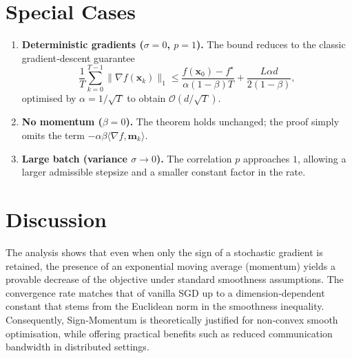 \documentclass{article}
\begin{document}
\section*{Special Cases}
\begin{enumerate}[label=\alph*.]
\item \textbf{Deterministic gradients ($\sigma=0$, $p=1$).}  
The bound reduces to the classic gradient‑descent guarantee
\[
\frac{1}{T}\sum_{k=0}^{T-1}\|\nabla f(\mathbf{x}_{k})\|_{1}
\le \frac{f(\mathbf{x}_{0})-f^{\star}}{\alpha(1-\beta)T}
+\frac{L\alpha d}{2(1-\beta)},
\]
optimised by $\alpha=1/\sqrt{T}$ to obtain $\mathcal{O}(d/\sqrt{T})$.
\item \textbf{No momentum ($\beta=0$).}  
The theorem holds unchanged; the proof simply omits the term $-\alpha\beta\langle\nabla f,\mathbf{m}_{k}\rangle$.
\item \textbf{Large batch (variance $\sigma\to0$).}  
The correlation $p$ approaches $1$, allowing a larger admissible stepsize and a smaller constant factor in the rate.
\end{enumerate}

\section*{Discussion}
The analysis shows that even when only the sign of a stochastic gradient is retained, the presence of an exponential moving average (momentum) yields a provable decrease of the objective under standard smoothness assumptions.  The convergence rate matches that of vanilla SGD up to a dimension‑dependent constant that stems from the Euclidean norm in the smoothness inequality.  Consequently, Sign‑Momentum is theoretically justified for non‑convex smooth optimisation, while offering practical benefits such as reduced communication bandwidth in distributed settings.
\end{document}
